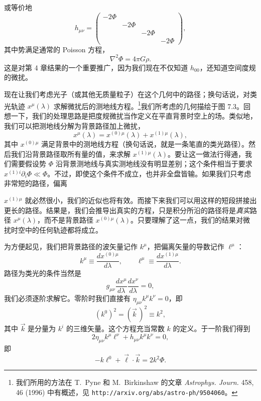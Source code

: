 或等价地
\begin{equation*}
h_{\mu\nu} =
\begin{pmatrix}
-2\Phi & & & \\
& -2\Phi & & \\
& & -2\Phi & \\
& & & -2\Phi
\end{pmatrix},
\tag{7.60}
\end{equation*}
其中势满足通常的 Poisson 方程，
\begin{equation*}
\nabla^2\Phi = 4\pi G\rho.
\tag{7.61}
\end{equation*}
这是对第 4 章结果的一个重要推广，因为我们现在不仅知道 $h_{00}$，还知道空间度规的微扰。

现在让我们考虑光子（或其他无质量粒子）在这个几何中的路径；换句话说，对类光轨迹 $x^\mu(\lambda)$ 求解微扰后的测地线方程。\footnote{我们所用的方法在 T.~Pyne 和 M.~Birkinshaw 的文章 \emph{Astrophys. Journ.} 458, 46 (1996) 中有概述，见 \texttt{http://arxiv.org/abs/astro-ph/9504060}。}我们所考虑的几何描绘于图 7.3。回想一下，我们的处理思路是把度规微扰当作定义在平直背景时空上的场。类似地，我们可以把测地线分解为背景路径加上微扰，
\begin{equation*}
x^\mu(\lambda) = x^{(0)\mu}(\lambda) + x^{(1)\mu}(\lambda),
\tag{7.62}
\end{equation*}
其中 $x^{(0)\mu}$ 满足背景中的测地线方程（换句话说，就是一条笔直的类光路径）。然后我们沿背景路径取所有量的值，来求解 $x^{(1)\mu}(\lambda)$。要让这一做法行得通，我们需要假设势 $\Phi$ 沿背景测地线与真实测地线没有明显差别；这个条件相当于要求 $x^{(1)i}\partial_i\Phi \ll \Phi$。不过，即使这个条件不成立，也并非全盘皆输。如果我们只考虑非常短的路径，偏离


$x^{(1)\mu}$ 就必然很小，我们的近似也将有效。而接下来我们可以用这样的短段拼接出更长的路径。结果是，我们会推导出真实的方程，只是积分所沿的路径将是\emph{真实}路径 $x^\mu(\lambda)$，而不是背景路径 $x^{(0)\mu}(\lambda)$。只要理解了这一点，我们的结果对微扰时空中的任何轨迹都将成立。

为方便起见，我们把背景路径的波矢量记作 $k^\mu$，把偏离矢量的导数记作 $\ell^\mu$：
\begin{equation*}
k^\mu \equiv \frac{dx^{(0)\mu}}{d\lambda}, \qquad \ell^\mu \equiv \frac{dx^{(1)\mu}}{d\lambda}.
\tag{7.63}
\end{equation*}
路径为类光的条件当然是
\begin{equation*}
g_{\mu\nu}\frac{dx^\mu}{d\lambda}\frac{dx^\nu}{d\lambda} = 0,
\tag{7.64}
\end{equation*}
我们必须逐阶求解它。零阶时我们直接有 $\eta_{\mu\nu}k^\mu k^\nu = 0$，即
\begin{equation*}
(k^0)^2 = (\vec{k}\,)^2 \equiv k^2,
\tag{7.65}
\end{equation*}
其中 $\vec{k}$ 是分量为 $k^i$ 的三维矢量。这个方程充当常数 $k$ 的定义。于一阶我们得到
\begin{equation*}
2\eta_{\mu\nu}k^\mu\ell^\nu + h_{\mu\nu}k^\mu k^\nu = 0,
\tag{7.66}
\end{equation*}
即
\begin{equation*}
-k\ell^0 + \vec{\ell}\cdot\vec{k} = 2k^2\Phi.
\tag{7.67}
\end{equation*}

